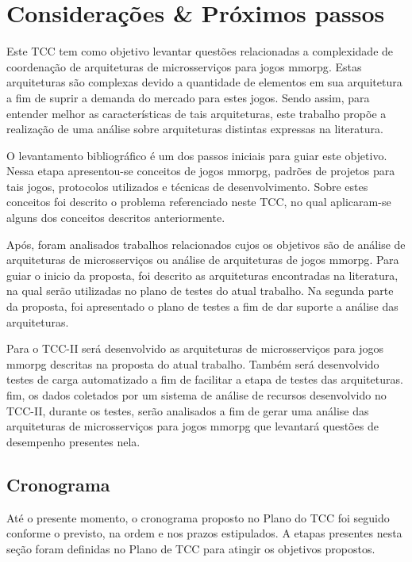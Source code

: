 \chapter{Considerações \& Próximos passos}
\label{cap:conclusao}

Este TCC tem como objetivo levantar questões relacionadas a complexidade de coordenação de arquiteturas de microsserviços para jogos \ac{mmorpg}.
%
Estas arquiteturas são complexas devido a quantidade de elementos em sua arquitetura a fim de suprir a demanda do mercado para estes jogos.
%
Sendo assim, para entender melhor as características de tais arquiteturas, este trabalho propõe a realização de uma análise sobre arquiteturas distintas expressas na literatura.



O levantamento bibliográfico é um dos passos iniciais para guiar este objetivo. Nessa etapa apresentou-se conceitos de jogos \ac{mmorpg}, padrões de projetos para tais jogos, protocolos utilizados e técnicas de desenvolvimento.
%
Sobre estes conceitos foi descrito o problema referenciado neste TCC, no qual aplicaram-se alguns dos conceitos descritos anteriormente.



Após, foram analisados trabalhos relacionados cujos os objetivos são de análise de arquiteturas de microsserviços ou análise de arquiteturas de jogos \ac{mmorpg}.
%
Para guiar o inicio da proposta, foi descrito as arquiteturas encontradas na literatura, na qual serão utilizadas no plano de testes do atual trabalho.
%
Na segunda parte da proposta, foi apresentado o plano de testes a fim de dar suporte a análise das arquiteturas.



Para o TCC-II será desenvolvido as arquiteturas de microsserviços para jogos \ac{mmorpg} descritas na proposta do atual trabalho.
%
Também será desenvolvido testes de carga automatizado a fim de facilitar a etapa de testes das arquiteturas.
%
fim, os dados coletados por um sistema de análise de recursos desenvolvido no TCC-II, durante os testes, serão analisados a fim de gerar uma análise das arquiteturas de microsserviços para jogos \ac{mmorpg} que levantará questões de desempenho presentes nela.

\section{Cronograma}

Até o presente momento, o cronograma proposto no Plano do TCC foi seguido conforme o previsto, na ordem e nos prazos estipulados.
%
A etapas presentes nesta seção foram definidas no Plano de TCC para atingir os objetivos propostos.

